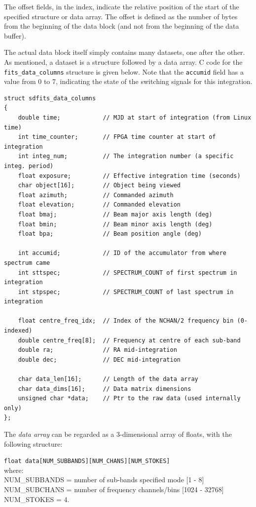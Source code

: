 \documentclass[11pt]{article} %
\begin{document}
The offset fields, in the index, indicate the relative position of the start of the specified structure or data array. The offset is defined as the number of bytes from the beginning of the data block (and not from the beginning of the data buffer).

The actual data block itself simply contains many datasets, one after the other. As mentioned, a dataset is a structure followed by a data array. C code for the \texttt{fits\_data\_columns} structure is given below. Note that the \texttt{accumid} field has a value from 0 to 7, indicating the state of the switching signals for this integration.

\begin{verbatim}
struct sdfits_data_columns
{
    double time;            // MJD at start of integration (from Linux time)
    int time_counter;       // FPGA time counter at start of integration
    int integ_num;          // The integration number (a specific integ. period)
    float exposure;         // Effective integration time (seconds)
    char object[16];        // Object being viewed
    float azimuth;          // Commanded azimuth
    float elevation;        // Commanded elevation
    float bmaj;             // Beam major axis length (deg)
    float bmin;             // Beam minor axis length (deg)
    float bpa;              // Beam position angle (deg)

    int accumid;            // ID of the accumulator from where spectrum came
    int sttspec;            // SPECTRUM_COUNT of first spectrum in integration
    int stpspec;            // SPECTRUM_COUNT of last spectrum in integration

    float centre_freq_idx;  // Index of the NCHAN/2 frequency bin (0-indexed)
    double centre_freq[8];  // Frequency at centre of each sub-band
    double ra;              // RA mid-integration
    double dec;             // DEC mid-integration

    char data_len[16];      // Length of the data array
    char data_dims[16];     // Data matrix dimensions
    unsigned char *data;    // Ptr to the raw data (used internally only)
};
\end{verbatim}

The {\em data array} can be regarded as a 3-dimensional array of floats, with the following structure:

\texttt{float data[NUM\_SUBBANDS][NUM\_CHANS][NUM\_STOKES]}
\\
where: \\
NUM\_SUBBANDS = number of sub-bands specified mode [1 - 8] \\
NUM\_SUBCHANS = number of frequency channels/bins [1024 - 32768] \\
NUM\_STOKES = 4.
\end{document}
